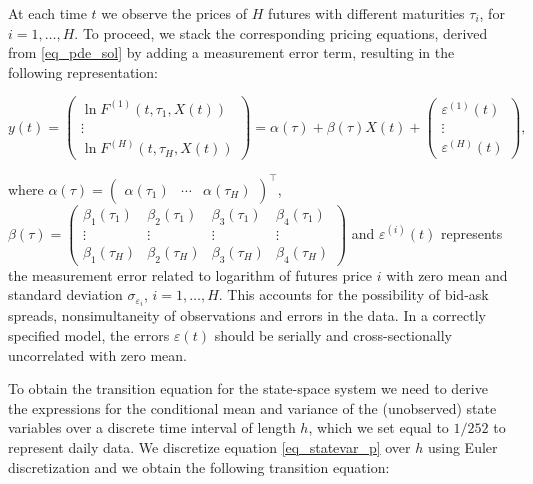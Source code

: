 \documentclass{article}
\begin{document}
At each time $t$ we observe the prices of $H$ futures with different maturities $\tau_i$, for $i=1,\ldots,H$. To proceed, we stack the corresponding pricing equations, derived from \eqref{eq_pde_sol} by adding a measurement error term, resulting in the following representation:

\begin{equation} 
\label{eq_obseq_futures}
         y(t) = \begin{pmatrix}
           \ln F^{(1)}(t,\tau_1,X(t))\\
           \vdots
           \\
           \ln F^{(H)} (t,\tau_{H},X(t)) 
         \end{pmatrix} = 
        \alpha (\tau)+ \beta (\tau) X(t) +
         \begin{pmatrix}
             \varepsilon^{(1)}(t) \\
             \vdots
             \\
             \varepsilon^{(H)}(t)
         \end{pmatrix},
\end{equation}

\noindent where $\alpha (\tau) = \begin{pmatrix}
    \alpha(\tau_1) & \cdots & \alpha(\tau_H)
\end{pmatrix}^\top$, $\beta (\tau) = \begin{pmatrix}
    \beta_1(\tau_1) & \beta_2(\tau_1) &
    \beta_3(\tau_1) & 
    \beta_4(\tau_1) \\
   \vdots &\vdots &\vdots & \vdots\\
    \beta_1(\tau_H) &
    \beta_2(\tau_H) &
    \beta_3(\tau_H) & 
    \beta_4(\tau_H)
\end{pmatrix}$ and $\varepsilon^{(i)}(t)$ represents the measurement error related to logarithm of futures price $i$ with zero mean and standard deviation $\sigma_{\varepsilon_i}$, $i=1,\ldots,H$. This accounts for the possibility of bid-ask spreads, nonsimultaneity of observations and errors in the data. In a correctly specified model, the errors $\varepsilon(t)$ should be serially and cross-sectionally uncorrelated with zero mean.

To obtain the transition equation for the state-space system we need to derive the expressions for the conditional mean and variance of the (unobserved) state variables over a discrete time interval of length $h$, which we set equal to $1/252$ to represent daily data. We discretize  equation \eqref{eq_statevar_p} over $h$ using Euler discretization and we obtain the following transition equation:
\end{document}
